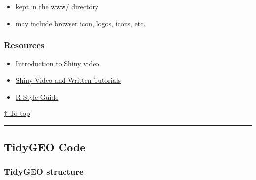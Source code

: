 \documentclass[]{article}
\providecommand{\tightlist}{%
  \setlength{\itemsep}{0pt}\setlength{\parskip}{0pt}}
\begin{document}
\begin{itemize}
\begin{itemize}
    \begin{itemize}
    \tightlist
    \item
      kept in the www/ directory
    \item
      may include browser icon, logos, icons, etc.
    \end{itemize}
  \end{itemize}
\end{itemize}

\hypertarget{shiny-apps-resources}{\subsubsection{Resources}\label{shiny-apps-resources}}

\begin{itemize}
\tightlist
\item
  \href{https://www.rstudio.com/resources/webinars/introduction-to-shiny/}{Introduction
  to Shiny video}
\item
  \href{https://shiny.rstudio.com/tutorial/}{Shiny Video and Written
  Tutorials}
\item
  \href{https://style.tidyverse.org/}{R Style Guide}
\end{itemize}

\protect\hyperlink{contents}{↑ To top}

\begin{center}\rule{0.5\linewidth}{\linethickness}\end{center}

\hypertarget{tidygeo-code}{\subsection{TidyGEO
Code}\label{tidygeo-code}}

\hypertarget{directory-structure}{\subsubsection{TidyGEO
structure}\label{directory-structure}}
\end{document}
